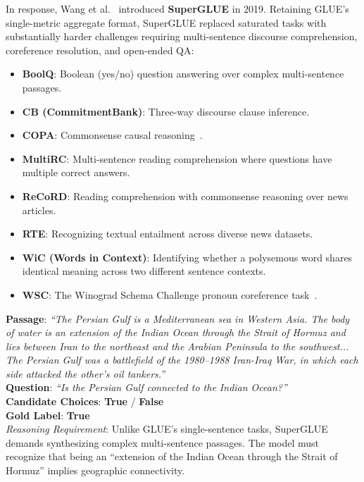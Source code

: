 \documentclass[../../main.tex]{subfiles}
\begin{document}
In response, Wang et al.~\cite{wang2019superglue} introduced \textbf{SuperGLUE} in 2019. Retaining GLUE's single-metric aggregate format, SuperGLUE replaced saturated tasks with substantially harder challenges requiring multi-sentence discourse comprehension, coreference resolution, and open-ended QA:
\begin{itemize}
    \item \textbf{BoolQ}: Boolean (yes/no) question answering over complex multi-sentence passages.
    \item \textbf{CB (CommitmentBank)}: Three-way discourse clause inference.
    \item \textbf{COPA}: Commonsense causal reasoning~\cite{roemmele2011copa}.
    \item \textbf{MultiRC}: Multi-sentence reading comprehension where questions have multiple correct answers.
    \item \textbf{ReCoRD}: Reading comprehension with commonsense reasoning over news articles.
    \item \textbf{RTE}: Recognizing textual entailment across diverse news datasets.
    \item \textbf{WiC (Words in Context)}: Identifying whether a polysemous word shares identical meaning across two different sentence contexts.
    \item \textbf{WSC}: The Winograd Schema Challenge pronoun coreference task~\cite{levesque2012winograd}.
\end{itemize}

\begin{center}
\begin{minipage}{0.95\textwidth}
\begin{tcolorbox}[colback=cardBg,colframe=cardLine,arc=2pt,boxrule=0.5pt,title=\textbf{SuperGLUE Benchmark Example: Boolean Question Answering (BoolQ)}]
\small\sffamily
\textbf{Passage}: \textit{``The Persian Gulf is a Mediterranean sea in Western Asia. The body of water is an extension of the Indian Ocean through the Strait of Hormuz and lies between Iran to the northeast and the Arabian Peninsula to the southwest... The Persian Gulf was a battlefield of the 1980--1988 Iran-Iraq War, in which each side attacked the other's oil tankers.''} \\
\textbf{Question}: \textit{``Is the Persian Gulf connected to the Indian Ocean?''} \\
\textbf{Candidate Choices}: \textbf{True} / \textbf{False} \\
\textbf{Gold Label}: \textbf{True} \\
\textit{Reasoning Requirement}: Unlike GLUE's single-sentence tasks, SuperGLUE demands synthesizing complex multi-sentence passages. The model must recognize that being an ``extension of the Indian Ocean through the Strait of Hormuz'' implies geographic connectivity.
\end{tcolorbox}
\end{minipage}
\end{center}
\end{document}
